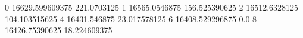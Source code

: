 0 16629.599609375 221.0703125
1 16565.0546875 156.525390625
2 16512.6328125 104.103515625
4 16431.546875 23.017578125
6 16408.529296875 0.0
8 16426.75390625 18.224609375
